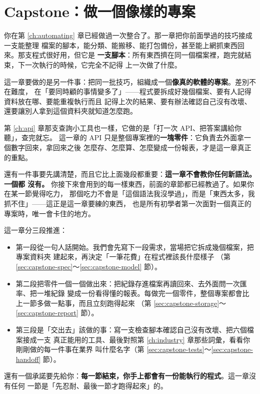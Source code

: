 \chapter{Capstone：做一個像樣的專案}
\label{ch:capstone}

你在第 \ref{ch:automating} 章已經做過一次整合了。那一章把你前面學過的技巧接成一支能整理
檔案的腳本，能分類、能搬移、能打包備份，甚至能上網抓東西回來。那支程式很好用，但它是
\textbf{一支腳本}：所有東西擠在同一個檔案裡，跑完就結束，下一次執行的時候，它完全不記得
上一次做了什麼。

這一章要做的是另一件事：把同一批技巧，組織成一個\textbf{像真的軟體的專案}。差別不在難度，
在「要同時顧的事情變多了」——程式要拆成好幾個檔案、要有人記得資料放在哪、要能重複執行而且
記得上次的結果、要有辦法確認自己沒有改壞、還要讓別人拿到這個資料夾就知道怎麼跑。

第 \ref{ch:api} 章那支查詢小工具也一樣，它做的是「打一次 API、把答案講給你聽」，查完就忘。
這一章的 API 只是整個專案裡的\textbf{一塊零件}：它負責去外面拿一個數字回來，拿回來之後
怎麼存、怎麼算、怎麼變成一份報表，才是這一章真正的重點。

還有一件事要先講清楚，而且它比上面幾段都重要：\textbf{這一章不會教你任何新語法。一個都
沒有。} 你接下來會用到的每一樣東西，前面的章節都已經教過了。如果你在某一節覺得吃力，
那個吃力不會是「這個語法我沒學過」，而是「東西太多，我抓不住」——這正是這一章要練的東西，
也是所有初學者第一次面對一個真正的專案時，唯一會卡住的地方。

這一章分三段推進：

\begin{itemize}
\item 第一段從一句人話開始。我們會先寫下一段需求，當場把它拆成幾個檔案，把專案資料夾
建起來，再決定「一筆花費」在程式裡該長什麼樣子
（第 \ref{sec:capstone-spec}～\ref{sec:capstone-model} 節）。
\item 第二段把零件一個一個做出來：把紀錄存進檔案再讀回來、去外面問一次匯率、把一堆紀錄
變成一份看得懂的報表。每做完一個零件，整個專案都會比上一節多做一點事，而且立刻跑得起來
（第 \ref{sec:capstone-storage}～\ref{sec:capstone-report} 節）。
\item 第三段是「交出去」該做的事：寫一支檢查腳本確認自己沒有改壞、把六個檔案接成一支
真正能用的工具、最後對照第 \ref{ch:industry} 章那些詞彙，看看你剛剛做的每一件事在業界
叫什麼名字（第 \ref{sec:capstone-tests}～\ref{sec:capstone-handoff} 節）。
\end{itemize}

還有一個承諾要先給你：\textbf{每一節結束，你手上都會有一份能執行的程式}。這一章沒有任何
一節是「先忍耐、最後一節才跑得起來」的。

